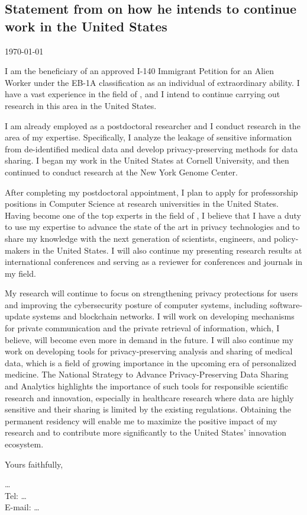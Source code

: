 \newpage
\subsection*{Statement from \drfull on how he intends to continue work in the United States}

\today
\bigskip

I am the beneficiary of an approved I-140 Immigrant Petition for an Alien Worker
under the EB-1A classification as an individual of extraordinary
ability. I have a vast experience in the field of \dpcs, and I intend to
continue carrying out research in this area in the United States.

I am already employed as a postdoctoral researcher and I conduct research in
the area of my expertise. 
Specifically, I analyze the leakage of sensitive information from de-identified
medical data and develop privacy-preserving methods for data sharing.
I began my work in the United States at Cornell University, and then continued
to conduct research at the New York Genome Center.


After completing my postdoctoral appointment, I plan to apply for professorship
positions in Computer Science at research universities in the United States.
Having become one of the top experts in the field of \dpcs, I believe that I
have a duty to use my expertise to advance the state of the art in privacy
technologies and to share my knowledge with the next generation of
scientists, engineers, and policy-makers in the United States.
I will also continue my presenting research results at international conferences
and serving as a reviewer for conferences and journals in my field.

My research will continue to focus on strengthening privacy protections for
users and improving the cybersecurity posture of computer systems, including
software-update systems and blockchain networks.
I will work on developing mechanisms for private communication and
the private retrieval of information, which, I believe, will become even more in
demand in the future.
I will also continue my work on developing tools for privacy-preserving
analysis and sharing of medical data, which is a field of growing importance in
the upcoming era of personalized medicine.
The National Strategy to Advance Privacy-Preserving Data Sharing and Analytics
highlights the importance of such tools for responsible scientific
research and innovation, especially in healthcare research where data are highly
sensitive and their sharing is limited by the existing regulations.
Obtaining the permanent residency will enable me to
maximize the positive impact of my research and to contribute more significantly
to the United States' innovation ecosystem.

Yours faithfully,

\vspace{4em}
\drfull

\ldots\\
Tel: \ldots\\
E-mail: \ldots

\pagebreak